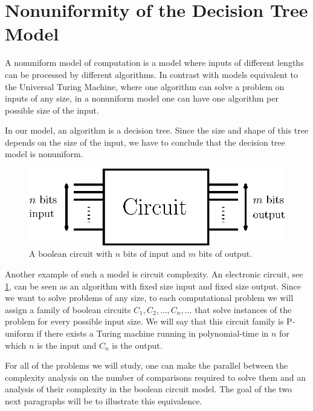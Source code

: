 \section{Nonuniformity of the Decision Tree Model}
\label{tree:sorting:nonuniformity}

A nonuniform model of computation is a model where inputs of different lengths
can be processed by different algorithms. In contrast with models equivalent to
the Universal Turing Machine, where one algorithm can solve a problem on inputs
of any size, in a nonuniform model one can have one algorithm per possible size
of the input.

In our model, an algorithm is a decision tree. Since the size and shape of
this tree depends on the size of the input, we have to conclude that the
decision tree model is nonuniform.

\begin{figure}
\center
\includegraphics[height=0.15\textheight]{fig/sorting/model/circuit}
\caption{A boolean circuit with \(n\) bits of input and \(m\) bits of output.}
\label{fig:sorting:nonuniformity:circuit}
\end{figure}

Another example of such a model is circuit complexity. An electronic circuit,
see \ref{fig:sorting:nonuniformity:circuit}, can be seen as an algorithm with
fixed size input and fixed size output. Since we want to solve problems of any
size, to each computational problem we will assign a family of boolean circuits
\(C_1,C_2,\ldots,C_n,\ldots\) that solve instances of the problem for every
possible input size. We will say that this circuit family is P-uniform if there
exists a Turing machine running in polynomial-time in \(n\) for which \(n\) is
the input and \(C_n\) is the output.

For all of the problems we will study, one can make the parallel between the
complexity analysis on the number of comparisons required to solve them and an
analysis of their complexity in the boolean circuit model. The goal of the two
next paragraphs will be to illustrate this equivalence.

